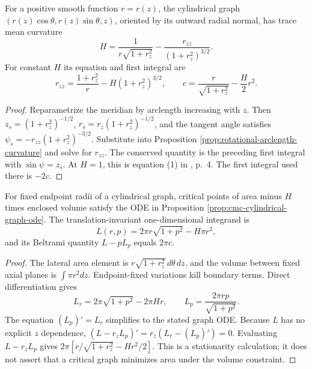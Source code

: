 \begin{proposition}\label{prop:cmc-cylindrical-graph-ode}
For a positive smooth function $r=r(z)$, the cylindrical graph $(r(z)\cos\theta,r(z)\sin\theta,z)$, oriented by its outward radial normal, has trace mean curvature
\[
 H=\frac1{r\sqrt{1+r_z^2}}-\frac{r_{zz}}{(1+r_z^2)^{3/2}}.
\]
For constant $H$ its equation and first integral are
\[
 r_{zz}=\frac{1+r_z^2}{r}-H(1+r_z^2)^{3/2},\qquad
 c=\frac r{\sqrt{1+r_z^2}}-\frac H2r^2.
\]
\end{proposition}
\begin{proof}
Reparametrize the meridian by arclength increasing with $z$. Then $z_s=(1+r_z^2)^{-1/2}$, $r_s=r_z(1+r_z^2)^{-1/2}$, and the tangent angle satisfies $\psi_s=-r_{zz}(1+r_z^2)^{-3/2}$. Substitute into Proposition \ref{prop:rotational-arclength-curvature} and solve for $r_{zz}$. The conserved quantity is the preceding first integral with $\sin\psi=z_s$. At $H=1$, this is equation (1) in \cite{Maz02}, p.~4. The first integral used there is $-2c$.
\end{proof}

\begin{proposition}\label{prop:rotational-cmc-beltrami}
For fixed endpoint radii of a cylindrical graph, critical points of area minus $H$ times enclosed volume satisfy the ODE in Proposition \ref{prop:cmc-cylindrical-graph-ode}. The translation-invariant one-dimensional integrand is
\[
 L(r,p)=2\pi r\sqrt{1+p^2}-H\pi r^2,
\]
and its Beltrami quantity $L-pL_p$ equals $2\pi c$.
\end{proposition}
\begin{proof}
The lateral area element is $r\sqrt{1+r_z^2}\,d\theta\,dz$, and the volume between fixed axial planes is $\int\pi r^2dz$. Endpoint-fixed variations kill boundary terms. Direct differentiation gives
\[
 L_r=2\pi\sqrt{1+p^2}-2\pi Hr,\qquad L_p=\frac{2\pi rp}{\sqrt{1+p^2}}.
\]
The equation $(L_p)'=L_r$ simplifies to the stated graph ODE. Because $L$ has no explicit $z$ dependence, $(L-r_zL_p)'=r_z(L_r-(L_p)')=0$. Evaluating $L-r_zL_p$ gives $2\pi[r/\sqrt{1+r_z^2}-Hr^2/2]$. This is a stationarity calculation; it does not assert that a critical graph minimizes area under the volume constraint.
\end{proof}

